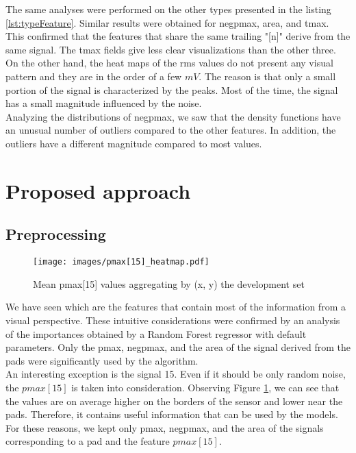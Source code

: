 \documentclass[conference]{IEEEtran}
\begin{document}
The same analyses were performed on the other types presented in the listing \ref{lst:typeFeature}. Similar results were obtained for negpmax, area, and tmax. This confirmed that the features that share the same trailing "[n]" derive from the same signal. The tmax fields give less clear visualizations than the other three. On the other hand, the heat maps of the rms values do not present any visual pattern and they are in the order of a few $mV$. The reason is that only a small portion of the signal is characterized by the peaks. Most of the time, the signal has a small magnitude influenced by the noise.\\


Analyzing the distributions of negpmax, we saw that the density functions have an unusual number of outliers compared to the other features. In addition, the outliers have a different magnitude compared to most values.

\section{Proposed approach}
\subsection{Preprocessing}

\begin{figure}[htbp]
\centerline{\texttt{[image: images/pmax[15]\_heatmap.pdf]}}
\caption{Mean pmax[15] values aggregating by (x, y) the development set}
\label{fig:pmax[15]_heatmap}
\end{figure}
We have seen which are the features that contain most of the information from a visual perspective. These intuitive considerations were confirmed by an analysis of the importances obtained by a Random Forest regressor with default parameters. Only the pmax, negpmax, and the area of the signal derived from the pads were significantly used by the algorithm.\\ 
An interesting exception is the signal 15. Even if it should be only random noise, the $pmax[15]$ is taken into consideration. Observing Figure \ref{fig:pmax[15]_heatmap}, we can see that the values are on average higher on the borders of the sensor and lower near the pads. Therefore, it contains useful information that can be used by the models. \\
For these reasons, we kept only pmax, negpmax, and the area of the signals corresponding to a pad and the feature $pmax[15]$.\\
\end{document}
